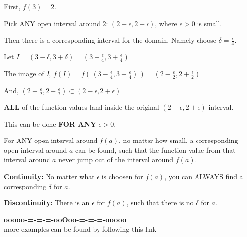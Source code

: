 \documentclass{ximera}
\begin{document}
\begin{example}
First, $f(3) = 2$. 


Pick ANY open interval around $2$:  $(2 - \epsilon, 2 + \epsilon)$, where $\epsilon > 0 $ is small. 

Then there is a corresponding interval for the domain. Namely choose $\delta = \frac{\epsilon}{4}$.

Let $I = (3 - \delta, 3 + \delta) = \left(3 - \frac{\epsilon}{4}, 3 + \frac{\epsilon}{4}\right)$


The image of $I$, $f(I) = f\left(\,\left(3 - \frac{\epsilon}{4}, 3 + \frac{\epsilon}{4}\right)\,\right) = \left(2 - \frac{\epsilon}{2}, 2 + \frac{\epsilon}{2}\right)$

And, $\left(2 - \frac{\epsilon}{2}, 2 + \frac{\epsilon}{2}\right) \subset  (2 - \epsilon, 2 + \epsilon) $


\textbf{ALL} of the function values land inside the original $(2 - \epsilon, 2 + \epsilon)$ interval.


This can be done \textbf{\textcolor{red!70!black}{FOR ANY}} $\epsilon > 0$. 


For ANY open interval around $f(a)$, no matter how small, a corresponding open interval around $a$ can be found, such that the function value from that interval around $a$ never jump out of the interval around $f(a)$.








\end{example}





\textbf{Continuity:} No matter what $\epsilon$ is choosen for $f(a)$, you can ALWAYS find a corresponding $\delta$ for $a$. 



\textbf{Discontinuity:} There is an $\epsilon$ for $f(a)$, such that there is no $\delta$ for $a$. 

























\begin{center}
\textbf{\textcolor{green!50!black}{ooooo-=-=-=-ooOoo-=-=-=-ooooo}} \\

more examples can be found by following this link\\ 

\end{center}
\end{document}
